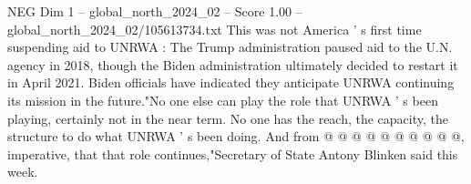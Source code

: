 \begin{textsample}{NEG Dim 1 – global\_north\_2024\_02 – Score 1.00 – global\_north\_2024\_02/105613734.txt}
This was not America ' s first time suspending aid to UNRWA : The Trump administration paused aid to the U.N. agency in 2018, though the Biden administration ultimately decided to restart it in April 2021.
Biden officials have indicated they anticipate UNRWA continuing its mission in the future."No one else can play the role that UNRWA ' s been playing, certainly not in the near term.
No one has the reach, the capacity, the structure to do what UNRWA ' s been doing.
And from @ @ @ @ @ @ @ @ @ @, imperative, that that role continues,"Secretary of State Antony Blinken said this week.

\end{textsample}
